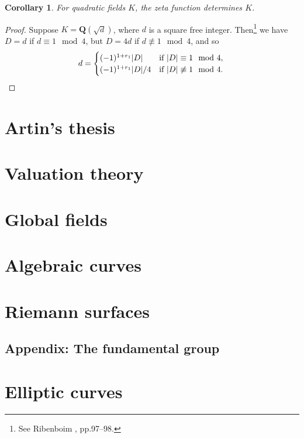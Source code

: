 \documentclass[10pt]{article}
\newtheorem{coro}[theo]{Corollary}
\theoremstyle{definition}
\def\QQ{\mathbf{Q}}
\def\fntwze{See Ribenboim \cite{bib:154}, pp.97--98.}
\begin{document}
\begin{coro}
\label{2.4.4}
For quadratic fields $K$, the zeta function determines $K$.
\end{coro}

\begin{proof}
Suppose $K = \QQ(\sqrt d)$, where $d$ is a square free integer.
Then\footnote{\fntwze} we have $D = d$ if $d \equiv 1 \mod 4$, but $D = 4d$ if $d \not\equiv 1 \mod 4$, and so
\[
d = \begin{cases}
(-1)^{1+r_1} |D| & \text{if $|D| \equiv 1 \mod 4$},
\\
(-1)^{1+r_1} |D|/4 & \text{if $|D| \not\equiv 1 \mod 4$}.
\end{cases}
\qedhere
\]
\end{proof}





\section{Artin's thesis}
\label{ch:3}

\section{Valuation theory}
\label{ch:4}

\section{Global fields}
\label{ch:5}

\section{Algebraic curves}
\label{ch:6}

\section{Riemann surfaces}
\label{ch:7}

\subsection{Appendix: The fundamental group}
\label{ch:7.8}

\section{Elliptic curves}
\label{ch:8}
\end{document}
